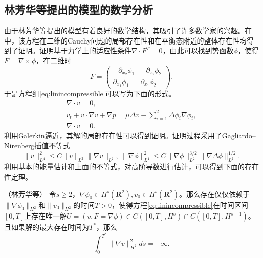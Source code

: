 \subsection{林芳华等提出的模型的数学分析}
由于林芳华等提出的模型有着良好的数学结构，其吸引了许多数学家的兴趣\cite{lin2005hydrodynamics,lebon2008classical,qian2010well,qian2011initial,hu2012formation,hu2015global}。在\cite{lin2005hydrodynamics}中，该方程在二维的Cauchy问题的局部存在性和在平衡态附近的整体存在性均得到了证明。证明基于力学上的适应性条件$\nabla \cdot F^T=0$，由此可以找到势函数$\phi$，使得$F = \nabla \times \phi$，在二维时
\begin{equation*}
	F = \left( \begin{matrix}
		-\partial_{x_2} \phi_1 &　-\partial_{x_2} \phi_2 \\
		\partial_{x_1} \phi_1 & \partial_{x_1} \phi_2
	\end{matrix}\right).
\end{equation*}
于是方程组\eqref{eq:linincompressible}可以写为下面的形式。
\begin{eqnarray*}
	\nabla \cdot v = 0, \\
	v_t + v \cdot \nabla v + \nabla p =  \mu \Delta v - \sum_{i=1}^2 \Delta \phi_i \nabla \phi_i, \\
	\nabla \cdot v = 0.
\end{eqnarray*}
利用Galerkin逼近，其解的局部存在性可以得到证明\cite{lin2005hydrodynamics}。证明过程采用了Gagliardo–Nirenberg插值不等式
\begin{equation*}
	\|v\|_{L^4}^2 \le C \|v\|_{L^2} \| \nabla v\|_{L^2} ,\ \|\nabla \phi\|_{L^4}^2 \le C \|\nabla \phi\|_{L^2}^{3/2} \|\nabla \Delta \phi\|_{L^2}^{1/2}.
\end{equation*}
利用基本的能量估计和上面的不等式，对高阶导数进行估计，可以得到下面的存在性定理。
\begin{theorem}（林芳华等\cite{lin2005hydrodynamics}）
	令$s \ge 2$，$\nabla \phi_0 \in H^s(\mathbf{R}^2),v_0 \in H^s(\mathbf{R}^2)$。那么存在仅仅依赖于$\|\nabla \phi_0\|_{H^2}$和$\|v_0\|_{H^2}$的时间$T>0$，使得方程\eqref{eq:linincompressible}在时间区间$[0,T]$上存在唯一解$U=(v,F=\nabla \phi) \in C([0,T],H^s) \cap C([0,T],H^{s+1})$。且如果解的最大存在时间为$T^*$，那么
	\begin{equation*}
		\int_0^{T^*} \|\nabla v\|_{H^2}^2 ds = + \infty.
	\end{equation*}
\end{theorem}

